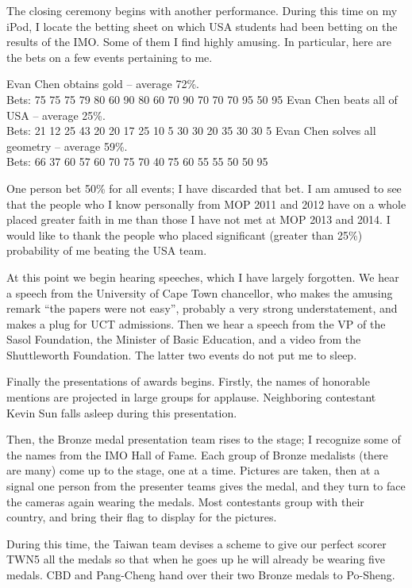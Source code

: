 \documentclass[11pt]{scrreprt}
\numberwithin{figure}{chapter}
\begin{document}
The closing ceremony begins with another performance.
During this time on my iPod, I locate the betting sheet on which USA students had been betting on the results of the IMO.
Some of them I find highly amusing.
In particular, here are the bets on a few events pertaining to me.
\begin{itemize}
  \ii Evan Chen obtains gold -- average 72\%. \\ Bets:
  75 75 75 79 80 60 90 80 60 70 90 70 70 70 95 50 95
  \ii Evan Chen beats all of USA -- average 25\%. \\ Bets:
  21 12 25 43 20 20 17 25 10  5 30 30 20 35 30 30  5
  \ii Evan Chen solves all geometry -- average 59\%. \\ Bets:
  66 37 60 57 60 70 75 70 40 75 60 55 55 50 50 95
\end{itemize}
One person bet 50\% for all events; I have discarded that bet.
I am amused to see that the people who I know personally from MOP 2011 and 2012 have
on a whole placed greater faith in me than those I have not met at MOP 2013 and 2014.
I would like to thank the people who placed significant (greater than 25\%)
probability of me beating the USA team.

At this point we begin hearing speeches, which I have largely forgotten.
We hear a speech from the University of Cape Town chancellor, who makes the amusing remark ``the papers were not easy'',
probably a very strong understatement, and makes a plug for UCT admissions.
Then we hear a speech from the VP of the Sasol Foundation, the Minister of Basic Education, and a
video from the Shuttleworth Foundation. The latter two events do not put me to sleep.

Finally the presentations of awards begins.
Firstly, the names of honorable mentions are projected in large groups for applause.
Neighboring contestant Kevin Sun falls asleep during this presentation.

Then, the Bronze medal presentation team rises to the stage; I recognize some of the names
from the IMO Hall of Fame.
Each group of Bronze medalists (there are many) come up to the stage, one at a time.
Pictures are taken, then at a signal one person from the presenter teams gives the medal, and
they turn to face the cameras again wearing the medals.
Most contestants group with their country, and bring their flag to display for the pictures.

During this time, the Taiwan team devises a scheme to give our perfect scorer TWN5 all the medals so that
when he goes up he will already be wearing five medals. CBD and Pang-Cheng hand over their two Bronze medals
to Po-Sheng.
\end{document}
